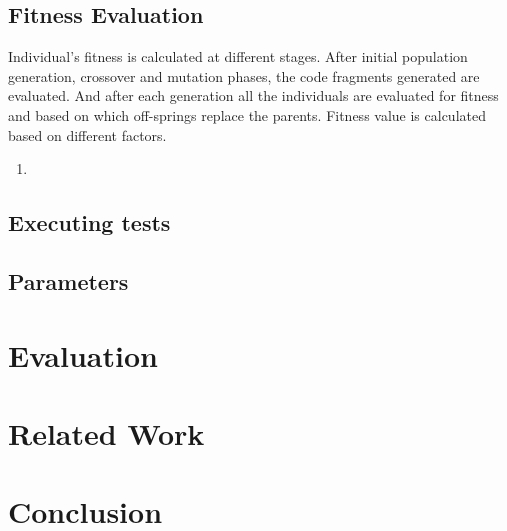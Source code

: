 \documentclass{sig-alternate}
\begin{document}
\subsection{Fitness Evaluation} \label{sec:fitness}
Individual's fitness is calculated at different stages. After initial population generation, crossover and mutation phases, the code fragments generated are evaluated. And after each generation all the individuals are evaluated for fitness and based on which off-springs replace the parents. Fitness value is calculated based on different factors.
\begin{enumerate}
\item
\end{enumerate}
\subsection{Executing tests}
\subsection{Parameters}
\section{Evaluation}
\section{Related Work}
\section{Conclusion}
\end{document}

